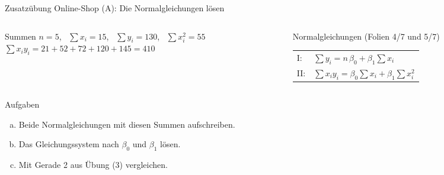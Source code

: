 \documentclass[aspectratio=169,11pt]{beamer}
\begin{document}
\begin{frame}{Zusatzübung Online-Shop (A): Die Normalgleichungen lösen}
  \begin{columns}[T]
    \begin{column}{0.47\textwidth}
      \begin{block}{Summen}
        $n = 5$, \ $\sum x_i = 15$, \ $\sum y_i = 130$, \ $\sum x_i^{2} = 55$\\[2pt]
        {\small $\sum x_i y_i = 21 + 52 + 72 + 120 + 145 = 410$}
      \end{block}
    \end{column}
    \begin{column}{0.51\textwidth}
      \begin{block}{Normalgleichungen (Folien 4/7 und 5/7)}
        \renewcommand{\arraystretch}{1.6}
        \begin{tabular}{@{}l@{\ \ }l@{}}
          I:  & $\sum y_i = n\,\beta_0 + \beta_1 \sum x_i$ \\
          II: & $\sum x_i y_i = \beta_0 \sum x_i + \beta_1 \sum x_i^{2}$
        \end{tabular}
      \end{block}
    \end{column}
  \end{columns}

  \medskip

  \begin{exampleblock}{Aufgaben}
    \begin{enumerate}[a)]
      \setlength{\itemsep}{2pt}
      \item Beide Normalgleichungen mit diesen Summen aufschreiben.
      \item Das Gleichungssystem nach $\beta_0$ und $\beta_1$ lösen.
      \item Mit Gerade 2 aus Übung (3) vergleichen.
    \end{enumerate}
  \end{exampleblock}
\end{frame}
\end{document}
